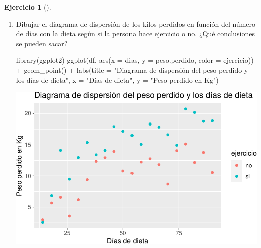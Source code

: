 \documentclass[
  a4paper,
]{scrreport}
\newenvironment{Shaded}{\begin{snugshade}}{\end{snugshade}}
\newcommand{\AttributeTok}[1]{\textcolor[rgb]{0.40,0.45,0.13}{#1}}
\newcommand{\FunctionTok}[1]{\textcolor[rgb]{0.28,0.35,0.67}{#1}}
\newcommand{\NormalTok}[1]{\textcolor[rgb]{0.00,0.23,0.31}{#1}}
\newcommand{\SpecialCharTok}[1]{\textcolor[rgb]{0.37,0.37,0.37}{#1}}
\newcommand{\StringTok}[1]{\textcolor[rgb]{0.13,0.47,0.30}{#1}}
\theoremstyle{definition}
\newtheorem{exercise}{Ejercicio}[chapter]
\theoremstyle{remark}
\begin{document}
\begin{exercise}[]
\begin{enumerate}
\begin{tcolorbox}
  \end{tcolorbox}
\item
  Dibujar el diagrama de dispersión de los kilos perdidos en función del
  número de días con la dieta según si la persona hace ejercicio o no.
  ¿Qué conclusiones se pueden sacar?

  \begin{tcolorbox}[enhanced jigsaw, toprule=.15mm, rightrule=.15mm, arc=.35mm, colback=white, colbacktitle=quarto-callout-tip-color!10!white, toptitle=1mm, left=2mm, colframe=quarto-callout-tip-color-frame, opacityback=0, breakable, opacitybacktitle=0.6, bottomtitle=1mm, titlerule=0mm, title=\textcolor{quarto-callout-tip-color}{\faLightbulb}\hspace{0.5em}{Solución}, bottomrule=.15mm, coltitle=black, leftrule=.75mm]

\begin{Shaded}
\begin{Highlighting}[]
\FunctionTok{library}\NormalTok{(ggplot2)}
\FunctionTok{ggplot}\NormalTok{(df, }\FunctionTok{aes}\NormalTok{(}\AttributeTok{x =}\NormalTok{ dias, }\AttributeTok{y =}\NormalTok{ peso.perdido, }\AttributeTok{color =}\NormalTok{ ejercicio)) }\SpecialCharTok{+}
    \FunctionTok{geom\_point}\NormalTok{() }\SpecialCharTok{+}
    \FunctionTok{labs}\NormalTok{(}\AttributeTok{title =} \StringTok{"Diagrama de dispersión del peso perdido y los días de dieta"}\NormalTok{, }\AttributeTok{x =} \StringTok{"Días de dieta"}\NormalTok{, }\AttributeTok{y =} \StringTok{"Peso perdido en Kg"}\NormalTok{)}
\end{Highlighting}
\end{Shaded}

  \includegraphics{05-regresion_files/figure-pdf/unnamed-chunk-37-1.pdf}


\end{tcolorbox}
\end{enumerate}
\end{exercise}
\end{document}
